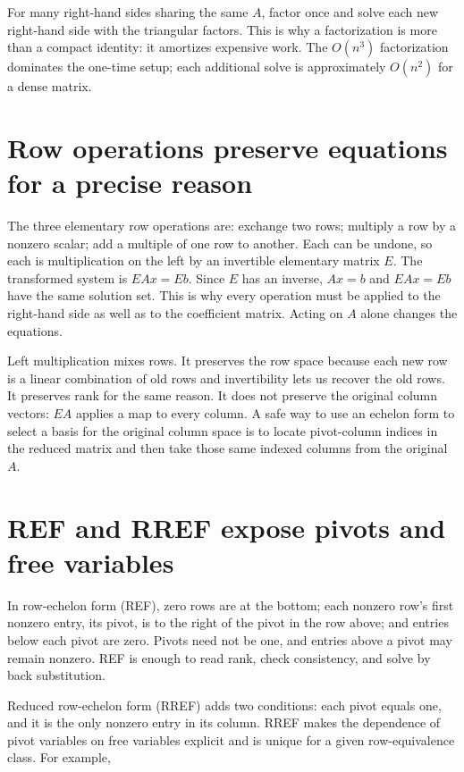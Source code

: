 For many right-hand sides sharing the same \(A\), factor once and solve each new right-hand side with the triangular factors. This is why a factorization is more than a compact identity: it amortizes expensive work. The \(O(n^3)\) factorization dominates the one-time setup; each additional solve is approximately \(O(n^2)\) for a dense matrix.

\section{Row operations preserve equations for a precise reason}\label{01-foundations-i-ch019-row-operations-preserve-equations-for-a-precise-reason}

The three elementary row operations are: exchange two rows; multiply a row by a nonzero scalar; add a multiple of one row to another. Each can be undone, so each is multiplication on the left by an invertible elementary matrix \(E\). The transformed system is \(EAx=Eb\). Since \(E\) has an inverse, \(Ax=b\) and \(EAx=Eb\) have the same solution set. This is why every operation must be applied to the right-hand side as well as to the coefficient matrix. Acting on \(A\) alone changes the equations.

Left multiplication mixes rows. It preserves the row space because each new row is a linear combination of old rows and invertibility lets us recover the old rows. It preserves rank for the same reason. It does not preserve the original column vectors: \(EA\) applies a map to every column. A safe way to use an echelon form to select a basis for the original column space is to locate pivot-column indices in the reduced matrix and then take those same indexed columns from the original \(A\).

\section{REF and RREF expose pivots and free variables}\label{01-foundations-i-ch019-ref-and-rref-expose-pivots-and-free-variables}

In row-echelon form (REF), zero rows are at the bottom; each nonzero row's first nonzero entry, its pivot, is to the right of the pivot in the row above; and entries below each pivot are zero. Pivots need not be one, and entries above a pivot may remain nonzero. REF is enough to read rank, check consistency, and solve by back substitution.

Reduced row-echelon form (RREF) adds two conditions: each pivot equals one, and it is the only nonzero entry in its column. RREF makes the dependence of pivot variables on free variables explicit and is unique for a given row-equivalence class. For example,


